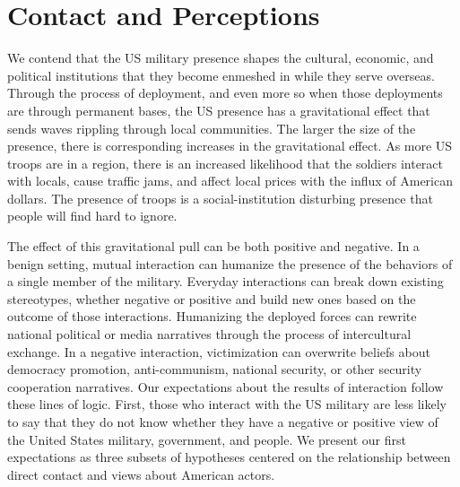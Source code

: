 \section*{Contact and Perceptions}

We contend that the US military presence shapes the cultural, economic, and political institutions that they become enmeshed in while they serve overseas. Through the process of deployment, and even more so when those deployments are through permanent bases, the US presence has a gravitational effect that sends waves rippling through local communities. The larger the size of the presence, there is corresponding increases in the gravitational effect. As more US troops are in a region, there is an increased likelihood that the soldiers interact with locals, cause traffic jams, and affect local prices with the influx of American dollars. The presence of troops is a social-institution disturbing presence that people will find hard to ignore.

The effect of this gravitational pull can be both positive and negative. In a benign setting, mutual interaction can humanize the presence of the behaviors of a single member of the military. Everyday interactions can break down existing stereotypes, whether negative or positive and build new ones based on the outcome of those interactions. Humanizing the deployed forces can rewrite national political or media narratives through the process of intercultural exchange. In a negative interaction, victimization can overwrite beliefs about democracy promotion, anti-communism, national security, or other security cooperation narratives. Our expectations about the results of interaction follow these lines of logic. First, those who interact with the US military are less likely to say that they do not know whether they have a negative or positive view of the United States military, government, and people. We present our first expectations as three subsets of hypotheses centered on the relationship between direct contact and views about American actors. 

